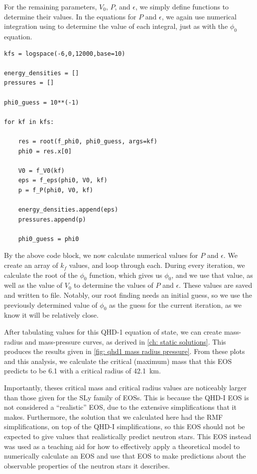 For the remaining parameters, $V_0$, $P$, and $\epsilon$, we simply define functions to determine their values. In the equations for $P$ and $\epsilon$, we again use numerical integration using  to determine the value of each integral, just as with the $\phi_0$ equation.

\begin{lstlisting}
kfs = logspace(-6,0,12000,base=10)

energy_densities = []
pressures = []

phi0_guess = 10**(-1)

for kf in kfs:

    res = root(f_phi0, phi0_guess, args=kf)
    phi0 = res.x[0]

    V0 = f_V0(kf)
    eps = f_eps(phi0, V0, kf)
    p = f_P(phi0, V0, kf)

    energy_densities.append(eps)
    pressures.append(p)

    phi0_guess = phi0
\end{lstlisting}

By the above code block, we now calculate numerical values for $P$ and $\epsilon$. We create an array of $k_f$ values, and loop through each. During every iteration, we calculate the root of the $\phi_0$ function, which gives us $\phi_0$, and we use that value, as well as the value of $V_0$ to determine the values of $P$ and $\epsilon$.  These values are saved and written to file. Notably, our root finding needs an initial guess, so we use the previously determined value of $\phi_0$ as the guess for the current iteration, as we know it will be relatively close.

After tabulating values for this QHD-1 equation of state, we can create mass-radius and mass-pressure curves, as derived in \autoref{ch: static solutions}. This produces the results given in \autoref{fig: qhd1 mass radius pressure}. From these plots and this analysis, we calculate the critical (maximum) mass that this EOS predicts to be \SI{6.1}{\odot} with a critical radius of \SI{42.1}{km}. 

Importantly, theses critical mass and critical radius values are noticeably larger than those given for the SLy family of EOSs. This is because the QHD-I EOS is not considered a ``realistic'' EOS, due to the extensive simplifications that it makes. Furthermore, the solution that we calculated here had the RMF simplifications, on top of the QHD-I simplifications, so this EOS should not be expected to give values that realistically predict neutron stars. This EOS instead was used as a teaching aid for how to effectively apply a theoretical model to numerically calculate an EOS and use that EOS to make predictions about the observable properties of the neutron stars it describes.
